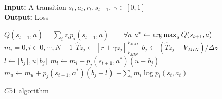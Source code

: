 \begin{algorithm}[H]
\begin{flushleft}
 \textbf{Input:} A transition $s_t,a_t,r_t,s_{t+1}$, $\gamma \in [0,1]$\\
 \textbf{Output:} Loss
\end{flushleft}
 \begin{algorithmic}
 \State $Q(s_{t+1},a)= \sum_{i} z_i p_i(s_{t+1},a)	\qquad \forall a$
 \State $a^* \leftarrow \operatorname*{arg\,max}_a Q(s_{t+1},a)$
 \State $m_i=0, i \in 0, \cdots, N-1$
 		\State $\widehat{T}z_j \leftarrow [r+\gamma z_j]_{V_{MIN}}^{V_{MAX}}$
 		\State $b_j \leftarrow (\widehat{T}z_j- V_{MIN}) / \Delta z$
 		\State $l \leftarrow \lfloor b_j\rfloor, u \lceil b_j \rceil$
 		\State $m_l \leftarrow m_l+ p_j(s_{t+1},a^*)(u-b_j)$
 		\State $m_u \leftarrow m_u+ p_j(s_{t+1},a^*)(b_j-l)$
 \EndFor
 \Return $-\sum_{i} m_i \log p_i(s_t,a_t)$
 \end{algorithmic}
 \caption{$C51$ algorithm}
 \label{alg:c51}
\end{algorithm}
